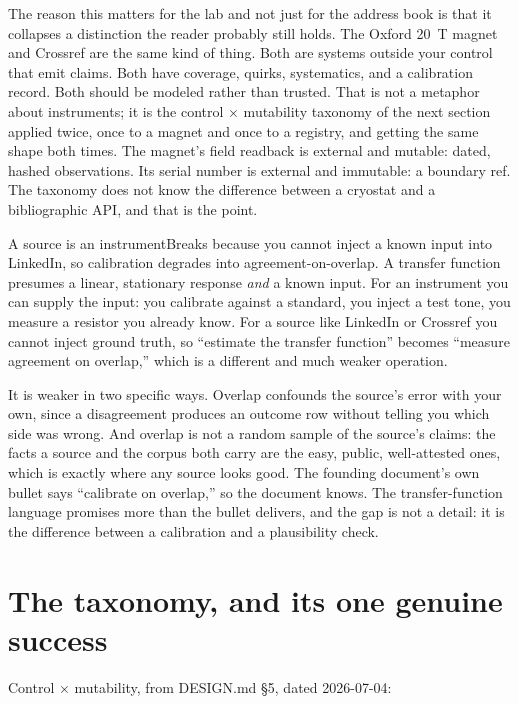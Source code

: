 The reason this matters for the lab and not just for the address book is that it collapses a distinction the reader probably still holds. The Oxford 20~T magnet and Crossref are the same kind of thing. Both are systems outside your control that emit claims. Both have coverage, quirks, systematics, and a calibration record. Both should be modeled rather than trusted. That is not a metaphor about instruments; it is the control $\times$ mutability taxonomy of the next section applied twice, once to a magnet and once to a registry, and getting the same shape both times. The magnet's field readback is external and mutable: dated, hashed observations. Its serial number is external and immutable: a boundary ref. The taxonomy does not know the difference between a cryostat and a bibliographic API, and that is the point.

\begin{Analogy}{A source is an instrument}{Breaks because you cannot inject a known input into LinkedIn, so calibration degrades into agreement-on-overlap.}
A transfer function presumes a linear, stationary response \emph{and} a known input. For an instrument you can supply the input: you calibrate against a standard, you inject a test tone, you measure a resistor you already know. For a source like LinkedIn or Crossref you cannot inject ground truth, so ``estimate the transfer function'' becomes ``measure agreement on overlap,'' which is a different and much weaker operation.

It is weaker in two specific ways. Overlap confounds the source's error with your own, since a disagreement produces an outcome row without telling you which side was wrong. And overlap is not a random sample of the source's claims: the facts a source and the corpus both carry are the easy, public, well-attested ones, which is exactly where any source looks good. The founding document's own bullet says ``calibrate on overlap,'' so the document knows. The transfer-function language promises more than the bullet delivers, and the gap is not a detail: it is the difference between a calibration and a plausibility check.
\end{Analogy}

\section{The taxonomy, and its one genuine success}

Control $\times$ mutability, from \textsf{DESIGN.md} \S5, dated 2026-07-04:

